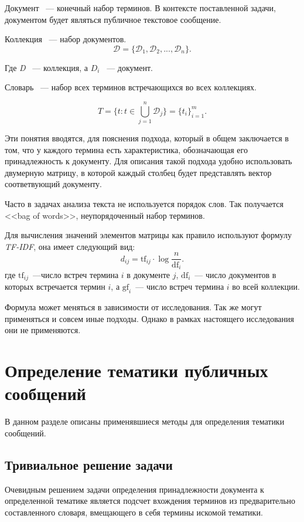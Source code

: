 \documentclass[annotation,times,page4]{itmo-student-thesis}
\begin{document}
Документ ~--- конечный набор терминов. В контексте поставленной задачи, документом будет являться публичное текстовое сообщение.

Коллекция ~--- набор документов.
\[
    \mathcal{D} = \{\mathcal{D}_1, \mathcal{D}_2,...,\mathcal{D}_n\}.
\]
 
Где \textit{D} ~--- коллекция, а $D_{i}$ ~--- документ.

Словарь ~--- набор всех терминов встречающихся во всех коллекциях.

\[
    T = \{t \colon t \in \bigcup_{j=1}^{n} \mathcal{D}_j\} = \{t_i\}_{i=1}^{m}.
\]

Эти понятия вводятся, для пояснения подхода, который в общем заключается в том, что у каждого термина есть характеристика, обозначающая его принадлежность к документу. Для описания такой подхода удобно использовать двумерную матрицу, в которой каждый столбец будет представлять вектор соответвующий документу.

Часто в задачах анализа текста не используется порядок слов. Так получается <<bag of words>>, неупорядоченный набор терминов.

Для вычисления значений элементов матрицы как правило используют формулу \textit{ TF-IDF}, она имеет следующий вид: 
\begin{equation}\label{eq:tf_idf}
    d_{ij} = \mathrm{tf}_{ij} \cdot \log{\frac{n}{\mathrm{df}_{i}}}.
\end{equation} 
где $\mathrm{tf}_{ij}$~---число встреч термина $i$ в документе $j$, $\mathrm{df}_{i}$~---
число документов в которых встречается термин $i$, а $\mathrm{gf}_{i}$~---
число встреч термина $i$ во всей коллекции.

Формула может меняться в зависимости от исследования. Так же могут применяться и совсем иные подходы. Однако в рамках настоящего исследования они не применяются.

\section{Определение тематики публичных сообщений}
В данном разделе описаны применявшиеся методы для определения тематики сообщений.
\subsection{Тривиальное решение задачи}
Очевидным решением задачи определения принадлежности документа к определенной тематике является подсчет вхождения терминов из предварительно составленного словаря, вмещающего в себя термины искомой тематики.
\end{document}
